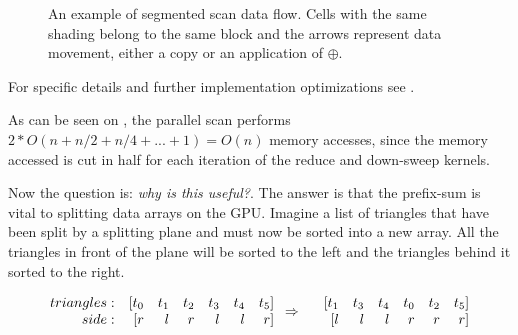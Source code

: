 \begin{figure}


  \parbox{8cm}{\caption[Segmented scan data flow.]{An example of segmented scan
      data flow. Cells with the same shading belong to the same block and the
      arrows represent data movement, either a copy or an application of
      $\oplus$.}\label{fig:segScan}}
\end{figure}

For specific details and further implementation optimizations see
\sengupta{}.



As can be seen on , the parallel scan performs $2 * O(n + n/2
+ n/4 + ... + 1) = O(n)$ memory accesses, since the memory accessed is cut in
half for each iteration of the reduce and down-sweep kernels.


Now the question is: \textit{why is this useful?}. The answer is that
the prefix-sum is vital to splitting data arrays on the GPU. Imagine a
list of triangles that have been split by a splitting plane and must
now be sorted into a new array. All the triangles in front of the
plane will be sorted to the left and the triangles behind it sorted to
the right.

\begin{displaymath}
  \begin{array} {r r r r r r r}
    triangles: & [t_0 & t_1 & t_2 & t_3 & t_4 & t_5]\\
    side: & [r & l & r & l & l & r]\\
  \end{array}
  \Rightarrow
  \begin{array} {r r r r r r r}
    &[t_1 & t_3 & t_4 & t_0 & t_2 & t_5]\\
    &[l & l & l & r & r & r]\\
  \end{array}
\end{displaymath}

